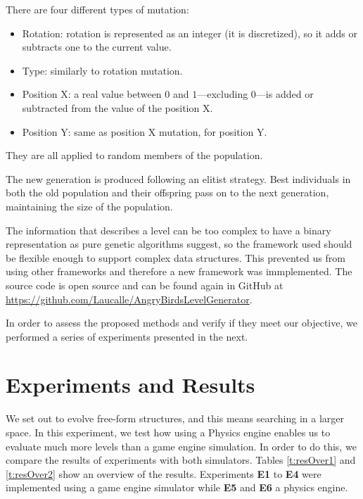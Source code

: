 \documentclass[a4paper,twoside]{article}
\begin{document}
There are four different types of mutation:

\begin{itemize}
	\item Rotation: rotation is represented as an integer (it is discretized), 
	so it adds or 
	subtracts one 
	to the current value. %
	\item Type: similarly to rotation mutation.
	\item Position X: a real value between $0$ and $1$---excluding $0$---is 
	added or subtracted from the value of the position X.
	\item Position Y: same as position X mutation, for position Y.
\end{itemize}

They are all applied to random members of the population.

The new generation is produced following an elitist strategy. Best individuals in 
both the old population and their offspring pass on to the next generation, 
maintaining the size of the population.

The information that describes a level can be too complex to have a binary 
representation as pure genetic algorithms suggest, so the framework used should be 
flexible enough to support complex data structures. This prevented us from using other 
frameworks and therefore a new framework was immplemented. The source code is open source and can be found again in GitHub at \url{https://github.com/Laucalle/AngryBirdsLevelGenerator}. %

In order to assess the proposed methods and verify if they meet our
objective, we performed a series of experiments presented in the next.

\section{Experiments and Results}\label{ch:res}

We set out to evolve free-form structures, and this means searching in a larger space. In this experiment, we test how using a Physics engine enables us to evaluate much more levels than a game engine simulation. In order to do this, we compare the results of experiments with both simulators. Tables \ref{t:resOver1} and \ref{t:resOver2} 
show an overview of the results. Experiments \textbf{E1} to \textbf{E4} were implemented 
using a game engine simulator while \textbf{E5} and \textbf{E6} a physics engine.
\end{document}
